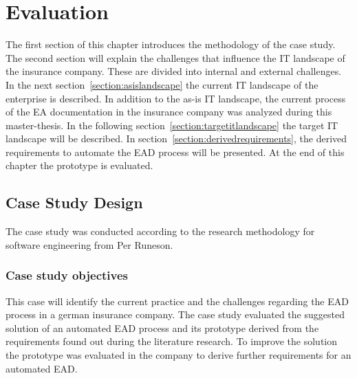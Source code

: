 \chapter{Evaluation}\label{chapter:evaluation}


The first section of this chapter introduces the methodology of the case study. 
The second section will explain the challenges that influence the IT landscape of the insurance company. These are divided into internal and external challenges. In the next section~\ref{section:asislandscape} the current IT landscape of the enterprise is described. In addition to the as-is IT landscape, the current process of the EA documentation in the insurance company was analyzed during this master-thesis. 
In the following section~\ref{section:targetitlandscape} the target IT landscape will be described.
In section~\ref{section:derivedrequirements}, the derived requirements to automate the EAD process will be presented.
At the end of this chapter the prototype is evaluated.

\section{Case Study Design}\label{section:casestudy}

The case study was conducted according to the research methodology for software engineering from Per Runeson. \cite{Runeson2009}

\subsection{Case study objectives}\label{subsection:casestudyobjectives}

This case will identify the current practice and the challenges regarding the EAD process in a german insurance company. The case study evaluated the suggested solution of an automated EAD process and its prototype derived from the requirements found out during the literature research. To improve the solution the prototype was evaluated in the company to derive further requirements for an automated EAD.

